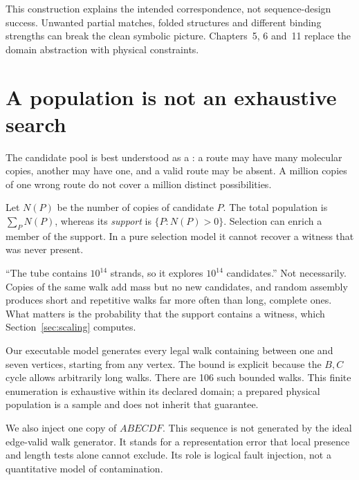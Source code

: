 This construction explains the intended correspondence, not sequence-design
success. Unwanted partial matches, folded structures and different binding
strengths can break the clean symbolic picture. Chapters~5, 6 and~11 replace the
domain abstraction with physical constraints.

\section{A population is not an exhaustive search}\label{sec:population}
The candidate pool is best understood as a : a route may have many
molecular copies, another may have one, and a valid route may be absent. A
million copies of one wrong route do not cover a million distinct possibilities.

Let $N(P)$ be the number of copies of candidate $P$. The total population is
$\sum_P N(P)$, whereas its \emph{support} is $\{P:N(P)>0\}$. Selection can enrich a
member of the support. In a pure selection model it cannot recover a witness that
was never present.

\begin{Pitfall}
``The tube contains $10^{14}$ strands, so it explores $10^{14}$ candidates.''
Not necessarily. Copies of the same walk add mass but no new candidates, and
random assembly produces short and repetitive walks far more often than long,
complete ones. What matters is the probability that the support contains a
witness, which Section~\ref{sec:scaling} computes.
\end{Pitfall}

Our executable model generates every legal walk containing between one and seven
vertices, starting from any vertex. The bound is explicit because the $B,C$
cycle allows arbitrarily long walks. There are 106 such bounded walks. This
finite enumeration is exhaustive within its declared domain; a prepared physical
population is a sample and does not inherit that guarantee.

We also inject one copy of $ABECDF$. This sequence is not generated by the ideal
edge-valid walk generator. It stands for a representation error that local
presence and length tests alone cannot exclude. Its role is logical fault
injection, not a quantitative model of contamination.

